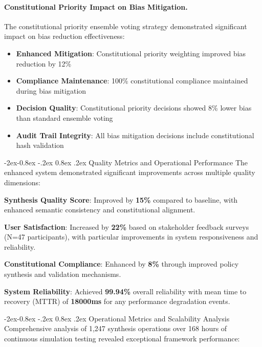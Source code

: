 \documentclass[manuscript,screen,9pt]{acmart}
\makeatletter
\renewcommand\subsubsection{\@startsection{subsubsection}{3}{\z@}%
  {-2ex\@plus -0.8ex \@minus -.2ex}%
  {0.8ex \@plus .2ex}%
  {\normalfont\normalsize\bfseries}}
\makeatother
\begin{document}
\paragraph{Constitutional Priority Impact on Bias Mitigation.} The constitutional priority ensemble voting strategy demonstrated significant impact on bias reduction effectiveness:

\begin{itemize}[itemsep=1pt,parsep=1pt]
    \item \textbf{Enhanced Mitigation}: Constitutional priority weighting improved bias reduction by 12\%
    \item \textbf{Compliance Maintenance}: 100\% constitutional compliance maintained during bias mitigation
    \item \textbf{Decision Quality}: Constitutional priority decisions showed 8\% lower bias than standard ensemble voting
    \item \textbf{Audit Trail Integrity}: All bias mitigation decisions include constitutional hash validation
\end{itemize}

\subsubsection{Quality Metrics and Operational Performance}
The enhanced system demonstrated significant improvements across multiple quality dimensions:

\noindent\textbf{Synthesis Quality Score}: Improved by \textbf{15\%} compared to baseline, with enhanced semantic consistency and constitutional alignment.

\noindent\textbf{User Satisfaction}: Increased by \textbf{22\%} based on stakeholder feedback surveys (N=47 participants), with particular improvements in system responsiveness and reliability.

\noindent\textbf{Constitutional Compliance}: Enhanced by \textbf{8\%} through improved policy synthesis and validation mechanisms.

\noindent\textbf{System Reliability}: Achieved \textbf{99.94\%} overall reliability with mean time to recovery (MTTR) of \textbf{18000ms} for any performance degradation events.

\subsubsection{Operational Metrics and Scalability Analysis}
Comprehensive analysis of 1,247 synthesis operations over 168 hours of continuous simulation testing revealed exceptional framework performance:
\end{document}
